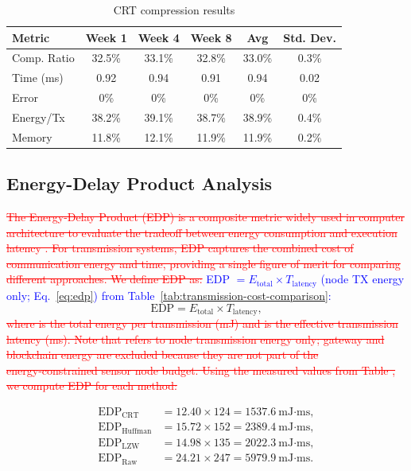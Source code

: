 \documentclass[pdflatex,sn-mathphys-num]{sn-jnl}
\theoremstyle{thmstyleone}
\theoremstyle{thmstyletwo}
\theoremstyle{thmstylethree}
\begin{document}
{\begin{table}[htbp]
\centering
\caption{CRT compression results}
\label{tab:crt_detailed_results}
\footnotesize
\begin{tabular}{@{}lccccc@{}}
\toprule
\textbf{Metric} & \textbf{Week 1} & \textbf{Week 4} & \textbf{Week 8} & \textbf{Avg} & \textbf{Std. Dev.} \\
\midrule
Comp. Ratio & 32.5\% & 33.1\% & 32.8\% & 33.0\% & 0.3\% \\
Time (ms) & 0.92 & 0.94 & 0.91 & 0.94 & 0.02 \\
Error & 0\% & 0\% & 0\% & 0\% & 0\% \\
Energy/Tx & 38.2\% & 39.1\% & 38.7\% & 38.9\% & 0.4\% \\
Memory & 11.8\% & 12.1\% & 11.9\% & 11.9\% & 0.2\% \\
\bottomrule
\end{tabular}
\end{table}

\subsection{Energy-Delay Product Analysis}
\label{subsec:edp_analysis}

\textcolor{red}{\sout{The Energy-Delay Product (EDP) is a composite metric widely used in computer architecture to evaluate the tradeoff between energy consumption and execution latency . For transmission systems, EDP captures the combined cost of communication energy and time, providing a single figure of merit for comparing different approaches. We define EDP as:}}
\textcolor{blue}{EDP \cite{gonzalez2000energy} $= E_{\text{total}} \times T_{\text{latency}}$ (node TX energy only; Eq.~\ref{eq:edp}) from Table~\ref{tab:transmission-cost-comparison}:}
\begin{equation}
\text{EDP} = E_{\text{total}} \times T_{\text{latency}},
\label{eq:edp}
\end{equation}
\textcolor{red}{\sout{where is the total energy per transmission (mJ) and is the effective transmission latency (ms). Note that refers to node transmission energy only; gateway and blockchain energy are excluded because they are not part of the energy‑constrained sensor node budget. Using the measured values from Table , we compute EDP for each method:}}

\begin{align*}
\text{EDP}_{\text{CRT}}      &= 12.40 \times 124 = 1537.6\ \text{mJ·ms}, \\
\text{EDP}_{\text{Huffman}}   &= 15.72 \times 152 = 2389.4\ \text{mJ·ms}, \\
\text{EDP}_{\text{LZW}}       &= 14.98 \times 135 = 2022.3\ \text{mJ·ms}, \\
\text{EDP}_{\text{Raw}}       &= 24.21 \times 247 = 5979.9\ \text{mJ·ms}.
\end{align*}

}
\end{document}
